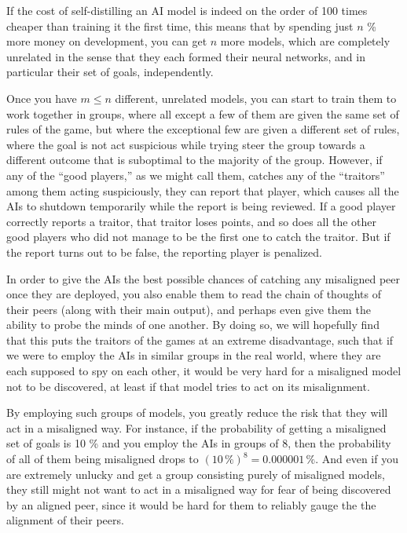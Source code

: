 \documentclass{article}
\begin{document}
If the cost of self-distilling an AI model is indeed on the order of 100 times cheaper than training it the first time, this means that by spending just $n$ \% more money on development, you can get $n$ more models, which are completely unrelated in the sense that they each formed their neural networks, and in particular their set of goals, independently.

Once you have $m \leq n$ different, unrelated models, you can start to train them to work together in groups, where all except a few of them are given the same set of rules of the game, but where the exceptional few are given a different set of rules, where the goal is not act suspicious while trying steer the group towards a different outcome that is suboptimal to the majority of the group. However, if any of the ``good players,'' as we might call them, catches any of the ``traitors'' among them acting suspiciously, they can report that player, which causes all the AIs to shutdown temporarily while the report is being reviewed. If a good player correctly reports a traitor, that traitor loses points, and so does all the other good players who did not manage to be the first one to catch the traitor. But if the report turns out to be false, the reporting player is penalized.

In order to give the AIs the best possible chances of catching any misaligned peer once they are deployed, you also enable them to read the chain of thoughts of their peers (along with their main output), and perhaps even give them the ability to probe the minds of one another. By doing so, we will hopefully find that this puts the traitors of the games at an extreme disadvantage, such that if we were to employ the AIs in similar groups in the real world, where they are each supposed to spy on each other, it would be very hard for a misaligned model not to be discovered, at least if that model tries to act on its misalignment.

By employing such groups of models, you greatly reduce the risk that they will act in a misaligned way. For instance, if the probability of getting a misaligned set of goals is 10 \% and you employ the AIs in groups of 8, then the probability of all of them being misaligned drops to $(10\, \%)^{8}=0.000001\, \%$. And even if you are extremely unlucky and get a group consisting purely of misaligned models, they still might not want to act in a misaligned way for fear of being discovered by an aligned peer, since it would be hard for them to reliably gauge the the alignment of their peers.
\end{document}
